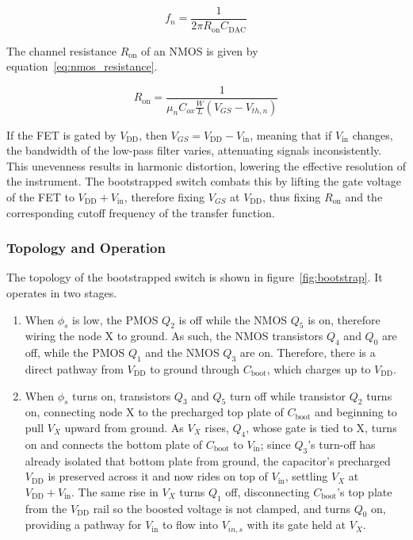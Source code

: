 \documentclass[12pt, a4paper]{article}
\begin{document}
\begin{equation}
    f_n = \frac{1}{2\pi R_\mathrm{on} C_\mathrm{DAC}} \label{eq:cutoff_frequency}
\end{equation}

The channel resistance $R_\mathrm{on}$ of an NMOS is given by equation~\ref{eq:nmos_resistance}.

\begin{equation}
    R_\mathrm{on} = \frac{1}{\mu_n C_{ox} \frac{W}{L} (V_{GS} - V_{th,n})} \label{eq:nmos_resistance}
\end{equation}

If the FET is gated by $V_\mathrm{DD}$, then $V_{GS} = V_\mathrm{DD} - V_\mathrm{in}$, meaning that if $V_\mathrm{in}$ changes, the bandwidth of the low-pass filter varies, attenuating signals inconsistently.
This unevenness results in harmonic distortion, lowering the effective resolution of the instrument. The bootstrapped switch \cite{abo1999bootstrap} combats this by lifting the gate voltage of the FET to $V_\mathrm{DD} + V_\mathrm{in}$, therefore 
fixing $V_{GS}$ at $V_\mathrm{DD}$, thus fixing $R_\mathrm{on}$ and the corresponding cutoff frequency of the transfer function.

\subsubsection{Topology and Operation}
The topology of the bootstrapped switch is shown in figure~\ref{fig:bootstrap}. It operates in two stages.

\begin{enumerate}
    \item When $\phi_s$ is low, the PMOS $Q_2$ is off while the NMOS $Q_5$ is on, therefore wiring the node X to ground. As such, the NMOS transistors $Q_4$ and $Q_0$ are off, while the PMOS $Q_1$ and the NMOS $Q_3$ are on. Therefore, there is a direct pathway from $V_\mathrm{DD}$ to ground through $C_\mathrm{boot}$, which charges up to $V_\mathrm{DD}$.
\item When $\phi_s$ turns on, transistors $Q_3$ and $Q_5$ turn off while transistor $Q_2$ turns on, connecting node X to the precharged top plate of $C_\mathrm{boot}$ and beginning to pull $V_X$ upward from ground. As $V_X$ rises, $Q_4$, whose gate is tied to X, turns on and connects the bottom plate of $C_\mathrm{boot}$ to $V_\mathrm{in}$; since $Q_3$'s turn-off has already isolated that bottom plate from ground, the capacitor's precharged $V_\mathrm{DD}$ is preserved across it and now rides on top of $V_\mathrm{in}$, settling $V_X$ at $V_\mathrm{DD} + V_\mathrm{in}$. The same rise in $V_X$ turns $Q_1$ off, disconnecting $C_\mathrm{boot}$'s top plate from the $V_\mathrm{DD}$ rail so the boosted voltage is not clamped, and turns $Q_0$ on, providing a pathway for $V_\mathrm{in}$ to flow into $V_{in,s}$ with its gate held at $V_X$.
\end{enumerate}
\end{document}
